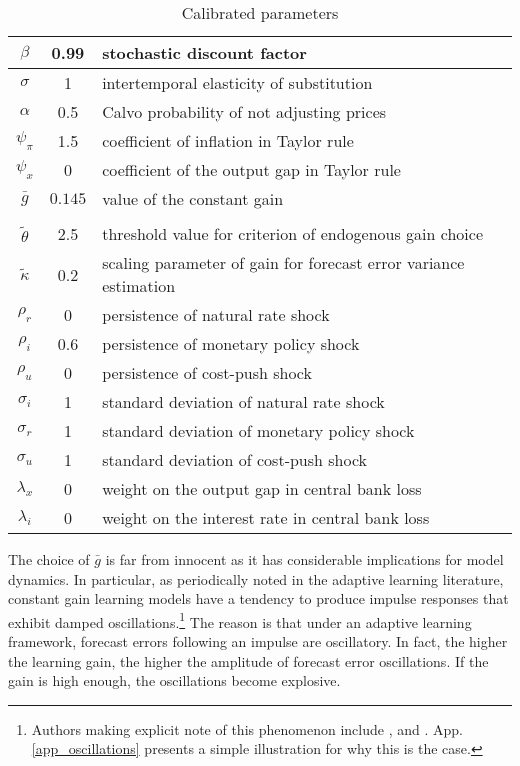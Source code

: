 \documentclass[11pt]{article}
\renewcommand{\[}{\begin{equation}}
\renewcommand{\]}{\end{equation}}
\begin{document}
\begin{center}
\begin{table}
\begin{tabular}{ c | c  | l }
 $\beta$ & 0.99 & stochastic discount factor \\  \hline
 $\sigma$ & 1  & intertemporal elasticity of substitution \\  \hline
 $\alpha$ & 0.5 &  Calvo probability of not adjusting prices \\\hline
 $\psi_{\pi} $& 1.5  & coefficient of inflation in Taylor rule \\\hline
 $\psi_x$ & 0   & coefficient of the output gap in Taylor rule  \\\hline
 $\bar{g}$ & $0.145$  & value of the constant gain \\\hline
& & \\ [-1em] %
 $\tilde{\theta}$ &  2.5  & threshold value for criterion of endogenous gain choice \\ \hline
  $\tilde{\kappa}$ &  0.2  & scaling parameter of gain for forecast error variance estimation \\ \hline
    $\rho_r$ & 0 &   persistence of natural rate shock \\ \hline
    $\rho_i$ & 0.6 &  persistence of monetary policy shock  \\ \hline
    $\rho_u$ & 0  &  persistence of cost-push shock  \\ \hline
    $\sigma_i$ & 1 & standard deviation of natural rate shock  \\ \hline
    $\sigma_r$ &  1  &standard deviation of monetary policy shock  \\ \hline
    $\sigma_u$ & 1 & standard deviation of cost-push shock   \\ \hline  
    $\lambda_x$ & 0 & weight on the output gap in central bank loss   \\ \hline  
    $\lambda_i$ & 0 & weight on the interest rate in central bank loss   \\ \hline  
\end{tabular}     
      \caption{Calibrated parameters}  \label{calibration}
 \end{table}
\end{center}

\vspace{-1.4cm}

The choice of $\bar{g}$ is far from innocent as it has considerable implications for model dynamics. In particular, as periodically noted in the adaptive learning literature, constant gain learning models have a tendency to produce impulse responses that exhibit damped oscillations.\footnote{Authors making explicit note of this phenomenon include \cite{evans_honkapohja2001}, \cite{evans2013bayesian} and \cite{anufriev2012evolutionary}. App. \ref{app_oscillations} presents a simple illustration for why this is the case.} The reason is that under an adaptive learning framework, forecast errors following an impulse are oscillatory. In fact, the higher the learning gain, the higher the amplitude of forecast error oscillations. If the gain is high enough, the oscillations become explosive. 
\end{document}
